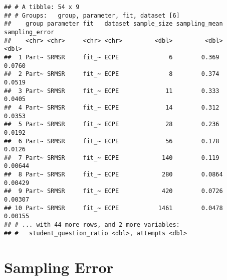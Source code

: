 \documentclass[]{article}
\begin{document}
\begin{verbatim}
## # A tibble: 54 x 9
## # Groups:   group, parameter, fit, dataset [6]
##    group parameter fit   dataset sample_size sampling_mean sampling_error
##    <chr> <chr>     <chr> <chr>         <dbl>         <dbl>          <dbl>
##  1 Part~ SRMSR     fit_~ ECPE              6        0.369         0.0760 
##  2 Part~ SRMSR     fit_~ ECPE              8        0.374         0.0519 
##  3 Part~ SRMSR     fit_~ ECPE             11        0.333         0.0405 
##  4 Part~ SRMSR     fit_~ ECPE             14        0.312         0.0353 
##  5 Part~ SRMSR     fit_~ ECPE             28        0.236         0.0192 
##  6 Part~ SRMSR     fit_~ ECPE             56        0.178         0.0126 
##  7 Part~ SRMSR     fit_~ ECPE            140        0.119         0.00644
##  8 Part~ SRMSR     fit_~ ECPE            280        0.0864        0.00429
##  9 Part~ SRMSR     fit_~ ECPE            420        0.0726        0.00307
## 10 Part~ SRMSR     fit_~ ECPE           1461        0.0478        0.00155
## # ... with 44 more rows, and 2 more variables:
## #   student_question_ratio <dbl>, attempts <dbl>
\end{verbatim}

\hypertarget{sampling-error}{%
\section{Sampling Error}\label{sampling-error}}
\end{document}
